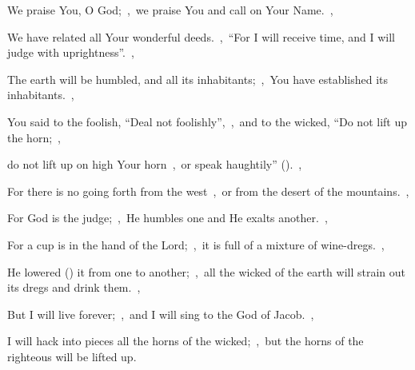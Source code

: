 \documentclass[12pt,twoside,a5paper]{article}
\begin{document}


\begin{halfparskip}
   We praise You, O God;~\sep\ we praise You and call on Your Name.~\sep


  We have related all Your wonderful deeds.~\sep\ ``For I will receive time, and I will judge with uprightness''.~\sep

  The earth will be humbled, and all its inhabitants;~\sep\ You have established its inhabitants.~\sep

  You said to the foolish, ``Deal not foolishly'',~\sep\ and to the wicked, ``Do not lift up the horn;~\sep

  do not lift up on high Your horn~\sep\ or speak haughtily'' ().~\sep

  For there is no going forth from the west~\sep\ or from the desert of the mountains.~\sep

  For God is the judge;~\sep\ He humbles one and He exalts another.~\sep

  For a cup is in the hand of the Lord;~\sep\ it is full of a mixture of wine-dregs.~\sep

  He lowered () it from one to another;~\sep\ all the wicked of the earth will strain out its dregs and drink them.~\sep

  But I will live forever;~\sep\ and I will sing to the God of Jacob.~\sep

  I will hack into pieces all the horns of the wicked;~\sep\ but the horns of the righteous will be lifted up.
\end{halfparskip}
\end{document}
